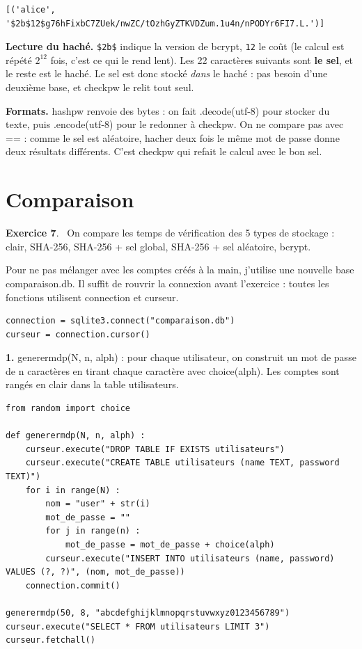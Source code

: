 \documentclass[11pt,a4paper]{article}
\newcommand{\code}[1]{\colorbox{fondcode}{\ttfamily\small #1}}
\newcommand{\q}{\textquotesingle}
\newcommand{\exo}[1]{\par\medskip\textbf{Exercice #1}.\ }
\begin{document}
\begin{lstlisting}[style=sortie]
[('alice', '$2b$12$g76hFixbC7ZUek/nwZC/tOzhGyZTKVDZum.1u4n/nPODYr6FI7.L.')]
\end{lstlisting}

\textbf{Lecture du haché.} \texttt{\$2b\$} indique la version de bcrypt, \texttt{12} le \og coût \fg{} (le calcul est répété $2^{12}$ fois, c'est ce qui le rend lent). Les 22 caractères suivants sont \textbf{le sel}, et le reste est le haché. Le sel est donc stocké \emph{dans} le haché : pas besoin d'une deuxième base, et \code{checkpw} le relit tout seul.

\textbf{Formats.} \code{hashpw} renvoie des \code{bytes} : on fait \code{.decode(\q{}utf-8\q{})} pour stocker du texte, puis \code{.encode(\q{}utf-8\q{})} pour le redonner à \code{checkpw}. On ne compare pas avec \code{==} : comme le sel est aléatoire, hacher deux fois le même mot de passe donne deux résultats différents. C'est \code{checkpw} qui refait le calcul avec le bon sel.

\section{Comparaison}

\exo{7} On compare les temps de vérification des 5 types de stockage : clair, SHA-256, SHA-256 + sel global, SHA-256 + sel aléatoire, bcrypt.

Pour ne pas mélanger avec les comptes créés à la main, j'utilise une nouvelle base \code{comparaison.db}. Il suffit de rouvrir la connexion avant l'exercice : toutes les fonctions utilisent \code{connection} et \code{curseur}.

\begin{lstlisting}
connection = sqlite3.connect("comparaison.db")
curseur = connection.cursor()
\end{lstlisting}

\textbf{1.} \code{generermdp(N, n, alph)} : pour chaque utilisateur, on construit un mot de passe de \code{n} caractères en tirant chaque caractère avec \code{choice(alph)}. Les comptes sont rangés en clair dans la table \code{utilisateurs}.

\begin{lstlisting}
from random import choice

def generermdp(N, n, alph) :
    curseur.execute("DROP TABLE IF EXISTS utilisateurs")
    curseur.execute("CREATE TABLE utilisateurs (name TEXT, password TEXT)")
    for i in range(N) :
        nom = "user" + str(i)
        mot_de_passe = ""
        for j in range(n) :
            mot_de_passe = mot_de_passe + choice(alph)
        curseur.execute("INSERT INTO utilisateurs (name, password) VALUES (?, ?)", (nom, mot_de_passe))
    connection.commit()

generermdp(50, 8, "abcdefghijklmnopqrstuvwxyz0123456789")
curseur.execute("SELECT * FROM utilisateurs LIMIT 3")
curseur.fetchall()
\end{lstlisting}
\end{document}
